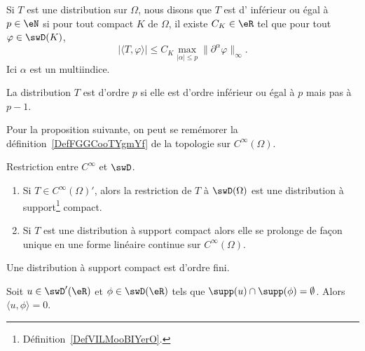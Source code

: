 \begin{definition}  \label{DefXAHIooFeiRMB}
    Si \( T\) est une distribution sur \( \Omega\), nous disons que \( T\) est d' inférieur ou égal à \( p\in \eN\) si pour tout compact \( K\) de \( \Omega\), il existe \( C_K\in \eR\) tel que pour tout \( \varphi\in \swD(K)\),
    \begin{equation}
        \big| \langle T, \varphi\rangle  \big|\leq C_K\max_{| \alpha |\leq p}\| \partial^{\alpha}\varphi \|_{\infty}.
    \end{equation}
    Ici \( \alpha\) est un multiindice.

    La distribution \( T\) est d'ordre \( p\) si elle est d'ordre inférieur ou égal à \( p\) mais pas à \( p-1\).
\end{definition}

Pour la proposition suivante, on peut se remémorer la définition~\ref{DefFGGCooTYgmYf} de la topologie sur \(  C^{\infty}(\Omega)\).
\begin{proposition}
    Restriction entre \(  C^{\infty}\) et \( \swD\).
    \begin{enumerate}
        \item
            Si \( T\in C^{\infty}(\Omega)'\), alors la restriction de \( T\) à \( \swD(\Omega)\) est une distribution à support\footnote{Définition~\ref{DefVILMooBIYerO}.} compact.
        \item
            Si \( T\) est une distribution à support compact alors elle se prolonge de façon unique en une forme linéaire continue sur \(  C^{\infty}(\Omega)\).
    \end{enumerate}
\end{proposition}

\begin{proposition}     \label{PropZLUEooHcVxQj}
    Une distribution à support compact est d'ordre fini.
\end{proposition}

\begin{lemma}   \label{LemYHRDooOdSnnK}
    Soit \( u\in\swD'(\eR)\) et \( \phi\in\swD(\eR)\) tels que \( \supp(u)\cap\supp(\phi)=\emptyset\). Alors \( \langle u, \phi\rangle =0\).
\end{lemma}


